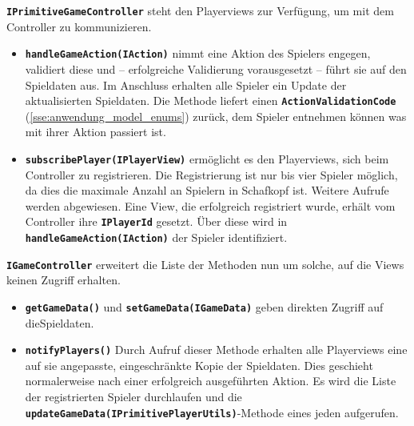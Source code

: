 \documentclass[
							a4paper, 
							11pt, 
							openany, 
							liststotoc,
							parskip=half, 
   							headings=normal
						]{scrreprt}
\begin{document}
{\textbf{\texttt{IPrimitiveGameController}} steht den Playerviews zur Verfügung, um mit dem Controller zu kommunizieren.
\begin{itemize}
	\item \textbf{\texttt{handleGameAction(IAction)}} nimmt eine Aktion des Spielers engegen, validiert diese und -- erfolgreiche Validierung vorausgesetzt -- führt sie auf den Spieldaten aus. Im Anschluss erhalten alle Spieler ein Update der aktualisierten Spieldaten. Die Methode liefert einen \textbf{\texttt{ActionValidationCode}} (\autoref{sse:anwendung_model_enums}) zurück, dem Spieler entnehmen können was mit ihrer Aktion passiert ist.
	\item \textbf{\texttt{subscribePlayer(IPlayerView)}} ermöglicht es den Playerviews, sich beim Controller zu registrieren. Die Registrierung ist nur bis vier Spieler möglich, da dies die maximale Anzahl an Spielern in Schafkopf ist. Weitere Aufrufe werden abgewiesen. Eine View, die erfolgreich registriert wurde, erhält vom Controller ihre \textbf{\texttt{IPlayerId}} gesetzt. Über diese wird in \textbf{\texttt{handleGameAction(IAction)}} der Spieler identifiziert.
\end{itemize}\bigskip

\textbf{\texttt{IGameController}} erweitert die Liste der Methoden nun um solche, auf die Views keinen Zugriff erhalten.
\begin{itemize}
	\item \textbf{\texttt{getGameData()}} und \textbf{\texttt{setGameData(IGameData)}} geben direkten Zugriff auf die\newline Spieldaten.
	\item \textbf{\texttt{notifyPlayers()}} Durch Aufruf dieser Methode erhalten alle Playerviews eine auf sie angepasste, eingeschränkte Kopie der Spieldaten. Dies geschieht normalerweise nach einer erfolgreich ausgeführten Aktion. Es wird die Liste der registrierten Spieler durchlaufen und die \textbf{\texttt{updateGameData(IPri\-mi\-ti\-ve\-Pla\-yer\-Utils)}}-Methode eines jeden aufgerufen. 
\end{itemize}\bigskip

}
\end{document}
